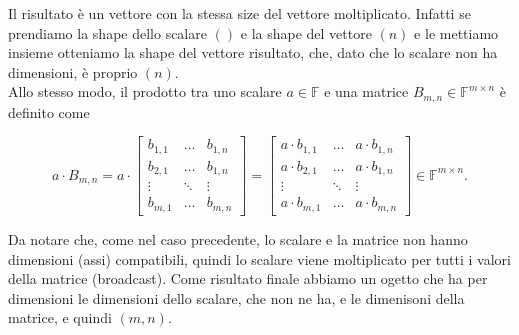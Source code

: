 Il risultato è un vettore con la stessa size del vettore moltiplicato. Infatti se prendiamo la shape dello scalare $()$ e la shape del vettore $(n)$ e le mettiamo insieme otteniamo la shape del vettore risultato, che, dato che lo scalare non ha dimensioni, è proprio $(n)$.
\\

Allo stesso modo, il prodotto tra uno scalare $a \in \mathbb F$ e una matrice $B_{m,n} \in\mathbb F^{m \times n}$ è definito come 

$$
a \cdot B_{m,n} = a \cdot \begin{bmatrix}
    b_{1,1} & \dots & b_{1,n}\\
    b_{2,1} & \dots & b_{1,n}\\
    \vdots  & \ddots & \vdots \\
    b_{m,1} & \dots & b_{m,n}
\end{bmatrix} = \begin{bmatrix}
    a \cdot b_{1,1} & \dots & a \cdot b_{1,n}\\
    a \cdot b_{2,1} & \dots & a \cdot b_{1,n}\\
    \vdots  & \ddots & \vdots \\
    a \cdot b_{m,1} & \dots & a \cdot b_{m,n}
\end{bmatrix} \in \mathbb F^{m \times n}.
$$

Da notare che, come nel caso precedente, lo scalare e la matrice non hanno dimensioni (assi) compatibili, quindi lo scalare viene moltiplicato per tutti i valori della matrice (broadcast). Come risultato finale abbiamo un ogetto che ha per dimensioni le dimensioni dello scalare, che non ne ha, e le dimenisoni della matrice, e quindi $(m,n)$.
\\

